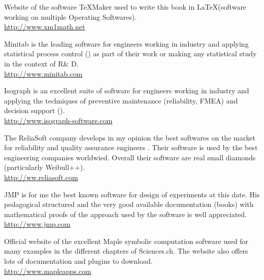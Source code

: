 	{\Large {}}{\Large {}}{\Large {}}{\Large {}} Website of the software TeXMaker used to write this book in \LaTeX (software working on multiple Operating Softwares).\\
	\href{http://www.xm1math.net/texmaker/index.html}{\color{blue}http://www.xm1math.net}
	
	{\Large {}}{\Large {}}{\Large {}}{\Large {}} Minitab is the leading software for engineers working in industry and applying statistical process control () as part of their work or making any statistical study in the context of R\& D.\\
	\href{http://www.minitab.com}{\color{blue}http://www.minitab.com}
	
	{\Large {}}{\Large {}}{\Large {}}{\Large {}} Isograph is an excellent suite of software for engineers working in industry and applying the techniques of preventive maintenance (reliability, FMEA) and decision support ().\\
	\href{http://www.isograph-software.com}{\color{blue}http://www.isograph-software.com}
	
	{\Large {}}{\Large {}}{\Large {}}{\Large {}} The ReliaSoft company develops in my opinion the best softwares on the market for reliability and quality assurance engineers . Their software is used by the best engineering companies worldwied. Overall their software are real small diamonds (particularly Weibull++).\\
	\href{http://ww.reliasoft.com}{\color{blue}http://ww.reliasoft.com}
	
	{\Large {}}{\Large {}}{\Large {}} JMP is for me the best known software for design of experiments at this date. His pedagogical structured and the very good available documentation (books) with mathematical proofs of the approach used by the software is well appreciated.\\
	\href{http://www.jmp.com}{\color{blue}http://www.jmp.com}
	
	{\Large {}}{\Large {}}{\Large {}}{\Large {}} Official website of the excellent Maple symbolic computation software used for many examples in the different chapters of Sciences.ch. The website also offers lots of documentation and plugins to download.\\
	\href{http://www.mapleapps.com}{\color{blue}http://www.mapleapps.com}
	

